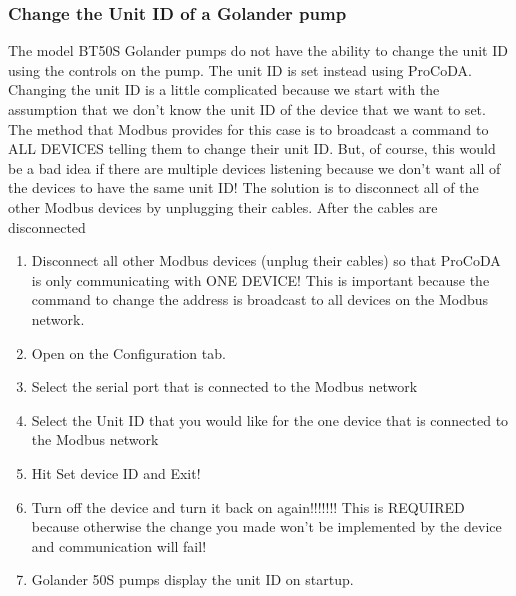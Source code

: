 \documentclass[letterpaper,10pt,english]{sphinxmanual}
\begin{document}
\subsubsection{Change the Unit ID of a Golander pump}
\label{\detokenize{ProCoDA/ProCoDA:change-the-unit-id-of-a-golander-pump}}
The model BT50S Golander pumps do not have the ability to change the unit ID using the controls on the pump. The unit ID is set instead using ProCoDA. Changing the unit ID is a little complicated because we start with the assumption that we don’t know the unit ID of the device that we want to set. The method that Modbus provides for this case is to broadcast a command to ALL DEVICES telling them to change their unit ID. But, of course, this would be a bad idea if there are multiple devices listening because we don’t want all of the devices to have the same unit ID! The solution is to disconnect all of the other Modbus devices by unplugging their cables. After the cables are disconnected
\begin{enumerate}
\item {} 
Disconnect all other Modbus devices (unplug their cables) so that ProCoDA is only communicating with ONE DEVICE! This is important because the command to change the address is broadcast to all devices on the Modbus network.

\item {} 
Open  on the Configuration tab.

\item {} 
Select the serial port that is connected to the Modbus network

\item {} 
Select the Unit ID that you would like for the one device that is connected to the Modbus network

\item {} 
Hit Set device ID and Exit!

\item {} 
Turn off the device and turn it back on again!!!!!!! This is REQUIRED because otherwise the change you made won’t be implemented by the device and communication will fail!

\item {} 
Golander 50S pumps display the unit ID on startup.

\end{enumerate}
\end{document}
